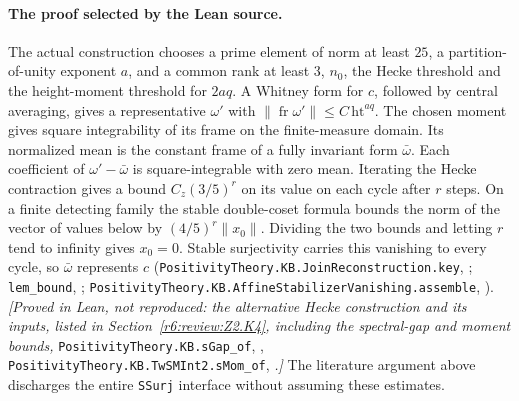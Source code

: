 \paragraph{The proof selected by the Lean source.}
The actual construction chooses a prime element of norm at least $25$,
a partition-of-unity exponent $a$, and a common rank at least $3$,
$n_0$, the Hecke threshold and the height-moment threshold for $2aq$.
A Whitney form for $c$, followed by central averaging, gives a representative
$\omega'$ with $\|\operatorname{fr}\omega'\|\le C\,\mathrm{ht}^{aq}$.
The chosen moment gives square integrability of its frame on the
finite-measure domain. Its normalized mean is the constant frame of a
fully invariant form $\bar\omega$. Each coefficient of
$\omega'-\bar\omega$ is square-integrable with zero mean. Iterating the
Hecke contraction gives a bound $C_z(3/5)^r$ on its value on each
cycle after $r$ steps. On a finite detecting family the stable double-coset
formula bounds the norm of the vector of values below by
$(4/5)^r\|x_0\|$. Dividing the two bounds and letting $r$ tend to
infinity gives $x_0=0$. Stable surjectivity carries this vanishing to
every cycle, so $\bar\omega$ represents $c$
(\nolinkurl{PositivityTheory.KB.JoinReconstruction.key},
;
\nolinkurl{lem_bound}, ;
\nolinkurl{PositivityTheory.KB.AffineStabilizerVanishing.assemble},
).
\textit{[Proved in Lean, not reproduced: the alternative Hecke construction and its inputs, listed in
Section~\ref{r6:review:Z2.K4}, including the spectral-gap and moment bounds,}
\nolinkurl{PositivityTheory.KB.sGap_of},
,
\nolinkurl{PositivityTheory.KB.TwSMInt2.sMom_of},
\textit{.]}
The literature argument above discharges the entire \nolinkurl{SSurj}
interface without assuming these estimates.

